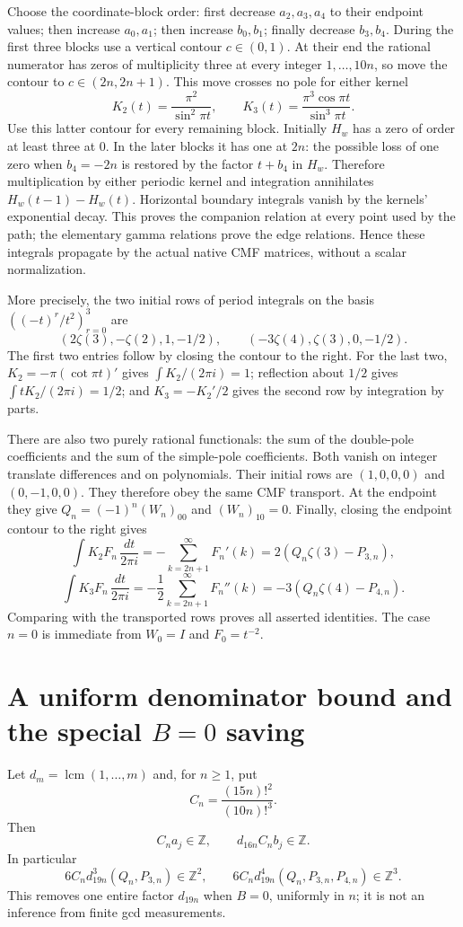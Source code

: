 \documentclass[11pt]{article}
\begin{document}
Choose the coordinate-block order: first decrease $a_2,a_3,a_4$ to their
endpoint values; then increase $a_0,a_1$; then increase $b_0,b_1$; finally
decrease $b_3,b_4$.  During the first three blocks use a vertical contour
$c\in(0,1)$.  At their end the rational numerator has zeros of multiplicity
three at every integer $1,\ldots,10n$, so move the contour to
$c\in(2n,2n+1)$.  This move crosses no pole for either kernel
\[
 K_2(t)=\frac{\pi^2}{\sin^2\pi t},\qquad
 K_3(t)=\frac{\pi^3\cos\pi t}{\sin^3\pi t}.
\]
Use this latter contour for every remaining block.  Initially $H_w$ has
a zero of order at least three at $0$.  In the later blocks it has one at
$2n$: the possible loss of one zero when $b_4=-2n$ is restored by the
factor $t+b_4$ in $H_w$.  Therefore multiplication by either periodic
kernel and integration annihilates $H_w(t-1)-H_w(t)$.  Horizontal boundary
integrals vanish by the kernels' exponential decay.  This proves the
companion relation at every point used by the path; the elementary gamma
relations prove the edge relations.  Hence these integrals propagate by
the actual native CMF matrices, without a scalar normalization.

More precisely, the two initial rows of period integrals on the basis
$((-t)^r/t^2)_{r=0}^3$ are
\[
 (2\zeta(3),-\zeta(2),1,-1/2),\qquad
 (-3\zeta(4),\zeta(3),0,-1/2).
\]
The first two entries follow by closing the contour to the right.
For the last two, $K_2=-\pi(\cot\pi t)'$ gives
$\int K_2/(2\pi i)=1$; reflection about $1/2$ gives
$\int tK_2/(2\pi i)=1/2$; and $K_3=-K_2'/2$ gives the second row by
integration by parts.

There are also two purely rational functionals: the sum of the double-pole
coefficients and the sum of the simple-pole coefficients.  Both vanish on
integer translate differences and on polynomials.  Their initial rows are
$(1,0,0,0)$ and $(0,-1,0,0)$.  They therefore obey the same CMF transport.
At the endpoint they give $Q_n=(-1)^n(W_n)_{00}$ and $(W_n)_{10}=0$.
Finally, closing the endpoint contour to the right gives
\[
 \int K_2F_n\,\frac{dt}{2\pi i}
   =-\sum_{k=2n+1}^{\infty}F_n'(k)=2(Q_n\zeta(3)-P_{3,n}),
\]
\[
 \int K_3F_n\,\frac{dt}{2\pi i}
   =-\frac12\sum_{k=2n+1}^{\infty}F_n''(k)
   =-3(Q_n\zeta(4)-P_{4,n}).
\]
Comparing with the transported rows proves all asserted identities.
The case $n=0$ is immediate from $W_0=I$ and $F_0=t^{-2}$.

\section{A uniform denominator bound and the special $B=0$ saving}
Let $d_m=\operatorname{lcm}(1,\ldots,m)$ and, for $n\ge1$, put
\[
 C_n=\frac{(15n)!^2}{(10n)!^3}.
\]
Then
\[
 C_na_j\in\mathbb Z,\qquad d_{16n}C_nb_j\in\mathbb Z.
\]
In particular
\[
 6C_nd_{19n}^3(Q_n,P_{3,n})\in\mathbb Z^2,\qquad
 6C_nd_{19n}^4(Q_n,P_{3,n},P_{4,n})\in\mathbb Z^3.
\]
This removes one entire factor $d_{19n}$ when $B=0$, uniformly in $n$;
it is not an inference from finite gcd measurements.
\end{document}
